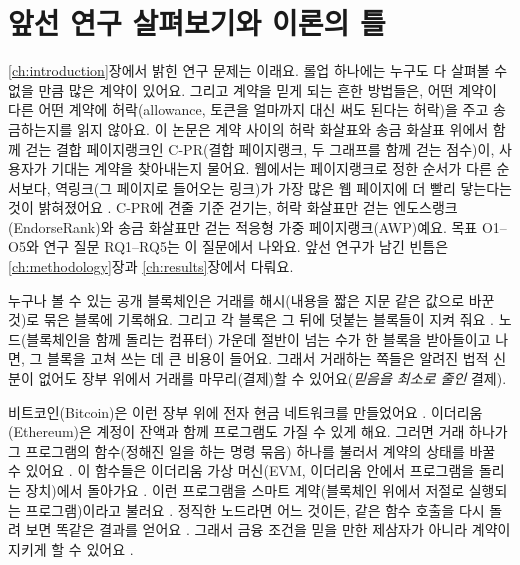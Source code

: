 \chapter{앞선 연구 살펴보기와 이론의 틀}
\label{ch:literature}

\ref{ch:introduction}장에서 밝힌 연구 문제는 이래요. 롤업 하나에는 누구도 다 살펴볼 수 없을 만큼 많은 계약이 있어요. 그리고 계약을 믿게 되는 흔한 방법들은, 어떤 계약이 다른 어떤 계약에 허락(allowance, 토큰을 얼마까지 대신 써도 된다는 허락)을 주고 송금하는지를 읽지 않아요. 이 논문은 계약 사이의 허락 화살표와 송금 화살표 위에서 함께 걷는 결합 페이지랭크인 \mbox{C-PR}(결합 페이지랭크, 두 그래프를 함께 걷는 점수)이, 사용자가 기대는 계약을 찾아내는지 물어요. 웹에서는 페이지랭크로 정한 순서가 다른 순서보다, 역링크(그 페이지로 들어오는 링크)가 가장 많은 웹 페이지에 더 빨리 닿는다는 것이 밝혀졌어요 \parencite{cho1998crawling}. \mbox{C-PR}에 견줄 기준 걷기는, 허락 화살표만 걷는 엔도스랭크(EndorseRank)와 송금 화살표만 걷는 적응형 가중 페이지랭크(AWP)예요. 목표 O1--O5와 연구 질문 RQ1--RQ5는 이 질문에서 나와요. 앞선 연구가 남긴 빈틈은 \ref{ch:methodology}장과 \ref{ch:results}장에서 다뤄요.


누구나 볼 수 있는 공개 블록체인은 거래를 해시(내용을 짧은 지문 같은 값으로 바꾼 것)로 묶은 블록에 기록해요. 그리고 각 블록은 그 뒤에 덧붙는 블록들이 지켜 줘요 \parencite{nakamoto2008bitcoin}. 노드(블록체인을 함께 돌리는 컴퓨터) 가운데 절반이 넘는 수가 한 블록을 받아들이고 나면, 그 블록을 고쳐 쓰는 데 큰 비용이 들어요. 그래서 거래하는 쪽들은 알려진 법적 신분이 없어도 장부 위에서 거래를 마무리(결제)할 수 있어요(\emph{믿음을 최소로 줄인} 결제).

비트코인(Bitcoin)은 이런 장부 위에 전자 현금 네트워크를 만들었어요 \parencite{nakamoto2008bitcoin}. 이더리움(Ethereum)은 계정이 잔액과 함께 프로그램도 가질 수 있게 해요. 그러면 거래 하나가 그 프로그램의 함수(정해진 일을 하는 명령 묶음) 하나를 불러서 계약의 상태를 바꿀 수 있어요 \parencite{buterin2014ethereum}. 이 함수들은 이더리움 가상 머신(EVM, 이더리움 안에서 프로그램을 돌리는 장치)에서 돌아가요 \parencite{wood2025yellowpaper}. 이런 프로그램을 스마트 계약(블록체인 위에서 저절로 실행되는 프로그램)이라고 불러요 \parencite{szabo1997formalizing}. 정직한 노드라면 어느 것이든, 같은 함수 호출을 다시 돌려 보면 똑같은 결과를 얻어요 \parencite{wood2025yellowpaper}. 그래서 금융 조건을 믿을 만한 제삼자가 아니라 계약이 지키게 할 수 있어요 \parencite{schar2021defi}.

